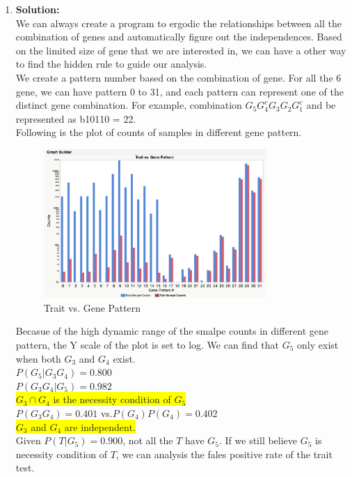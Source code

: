 \documentclass{article}
\newcommand{\mysolu}{\textbf{Solution:}\\}
\begin{document}
\begin{enumerate}
\begin{enumerate}
		\item
		\mysolu
		We can always create a program to ergodic the relationships between all the combination of genes and automatically figure out the independences. Based on the limited size of gene that we are interested in, we can have a other way to find the hidden rule to guide our analysis.\\
		We create a pattern number based on the combination of gene. For all the 6 gene, we can have pattern 0 to 31, and each pattern can represent one of the distinct gene combination. For example, combination ${G_5 G_4^c G_3 G_2 G_1^c}$ and be represented as b10110 = 22.\\
		Following is the plot of counts of samples in different gene pattern.\\
		\begin{figure}[H]
			\caption{Trait vs. Gene Pattern}
			\centering
			\includegraphics[width=0.8\textwidth]{bat.png}
		\end{figure}
		Becasue of the high dynamic range of the smalpe counts in different gene pattern, the Y scale of the plot is set to log. We can find that ${G_5}$ only exist when both ${G_3}$ and ${G_4}$ exist.\\
		${P(G_5|G_3G_4)=0.800}$\\
		${P(G_3G_4|G_5) =0.982}$\\
		\colorbox{yellow}{${G_3 \cap G_4}$ is the necessity condition of ${G_5}$}\\
		${P(G_3G_4) = 0.401}$ vs.${P(G_4)P(G_4)=0.402}$\\ 
		\colorbox{yellow}{${G_3}$ and ${G_4}$ are independent.}\\
		Given ${P(T|G_5) = 0.900}$, not all the ${T}$ have ${G_5}$. If we still believe ${G_5}$ is necessity condition of ${T}$, we can analysis the fales positive rate of the trait test.\\

\end{enumerate}
\end{enumerate}
\end{document}
